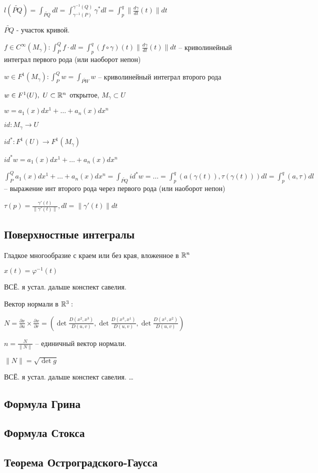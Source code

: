   $l(\widetilde{PQ}) = \int_{\widetilde{PQ}}dl = \int^{\gamma^{-1}(Q)}_{\gamma^{-1}(P)}\gamma^*dl = \int^q_p \| \frac{d\gamma}{dt}(t)\| dt$

  $\widetilde{PQ}$ - участок кривой. 

  \begin{definition}
    $f \in C^\infty(M_\gamma) : \int^Q_P f\cdot dl = \int^q_p (f\circ \gamma)(t) \| \frac{d\gamma}{dt}(t)\| dt$ -- криволинейный интеграл первого рода (или наоборот непон)
  \end{definition}
  \begin{definition}
    $w \in F^1(M_\gamma): \int^Q_P w = \int_{\widetilde{PW}}w$ -- криволинейный интеграл второго рода
  \end{definition}

  $w \in F^1(U), \ U \subset \mathbb{R}^n$ открытое, $M_\gamma \subset U$

  $w = a_1(x)dx^1 + \dotsc + a_n(x)dx^n$

  $id: M_\gamma \to U$

  $id^*: F^1(U) \to F^1(M_\gamma)$

  $id^*w = a_1(x)dx^1 + \dotsc + a_n(x)dx^n$

  $\int^Q_P a_1(x)dx^1 + \dotsc + a_n(x)dx^n = \int_{\widetilde{PQ}}id^*w = \dotsc = \int^q_p(a(\gamma(t)), \tau(\gamma(t)))dl = \int^q_p(a, \tau)dl$ -- выражение инт второго рода через первого рода (или наоборот непон)

  $\tau(p) = \frac{\gamma'(t)}{\|\gamma'(t) \|}, dl = \| \gamma'(t) \|dt$

  \subsection*{Поверхностные интегралы}

  Гладкое многообразие с краем или без края, вложенное в $\mathbb{R}^n$

  $x(t) = \varphi^{-1}(t)$

  ВСЁ. я устал. дальше конспект савелия.
  
  Вектор нормали в $\mathbb{R}^3:$

  $N = \frac{\partial x}{\partial u}\times \frac{\partial x}{\partial r} = (\det \frac{D(x^2, x^3)}{D(u,v)}, \det \frac{D(x^3, x^1)}{D(u,v)}, \det \frac{D(x^1, x^2)}{D(u,v)})$

  $n = \frac{N}{\| N\|}$ -- единичный вектор нормали.

  $\| N\| = \sqrt{\det g}$
  
  ВСЁ. я устал. дальше конспект савелия.
  \dots

  \subsection*{Формула Грина}

  \subsection*{Формула Стокса}

  \subsection*{Теорема Остроградского-Гаусса}
